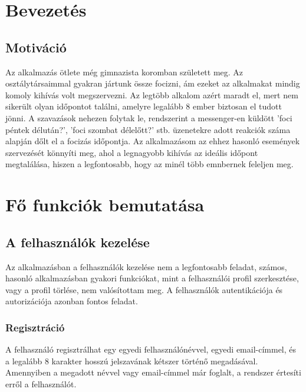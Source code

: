 \documentclass[a4paper,12pt]{report}
\theoremstyle{definition}
\theoremstyle{remark}
\begin{document}
\pagebreak

\tableofcontents
\pagebreak








\chapter{Bevezetés}

\section{Motiváció}

Az alkalmazás ötlete még gimnazista koromban született meg. Az osztálytársaimmal gyakran jártunk össze focizni, ám ezeket az alkalmakat mindig komoly kihívás volt megszervezni. Az legtöbb alkalom azért maradt el, mert nem sikerült olyan időpontot találni, amelyre legalább 8 ember biztosan el tudott jönni. A szavazások nehezen folytak le, rendszerint a messenger-en küldött 'foci péntek délután?', 'foci szombat délelőtt?' stb. üzenetekre adott reakciók száma alapján dőlt el a focizás időpontja. Az alkalmazásom az ehhez hasonló események szervezését könnyíti meg, ahol a legnagyobb kihívás az ideális időpont megtalálása, hiszen a legfontosabb, hogy az minél több emnbernek feleljen meg.

\chapter{Fő funkciók bemutatása}

\section{A felhasználók kezelése}

Az alkalmazásban a felhasználók kezelése nem a legfontosabb feladat, számos, hasonló alkalmazásban gyakori funkciókat, mint a felhasználói profil szerkesztése, vagy a profil törlése, nem valósítottam meg. A felhasználók autentikációja és autorizációja azonban fontos feladat.

	\subsection{Regisztráció}

A felhasználó regisztrálhat egy egyedi felhasználónévvel, egyedi email-címmel, és a legalább 8 karakter hosszú jelszavának kétszer történő megadásával. Amennyiben a megadott névvel vagy email-címmel már foglalt, a rendszer értesíti erről a felhasználót.
\end{document}
